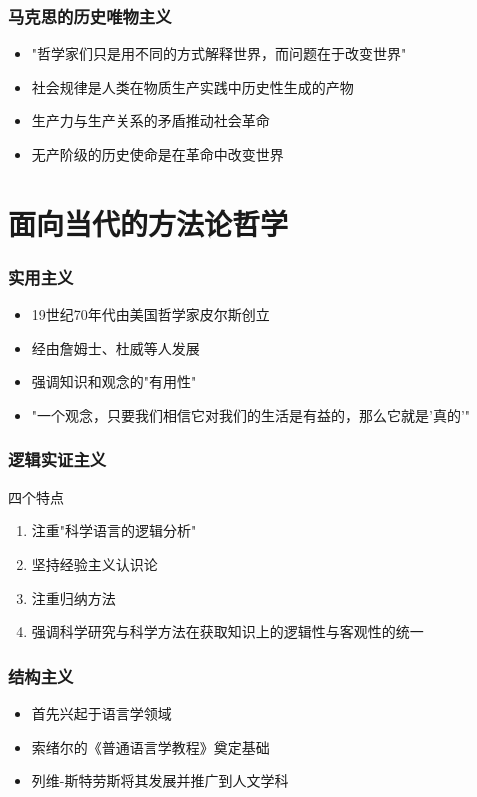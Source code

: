 \documentclass{beamer}
\begin{document}
\begin{frame}
\frametitle{马克思的历史唯物主义}
\begin{itemize}
\item "哲学家们只是用不同的方式解释世界，而问题在于改变世界"
\item 社会规律是人类在物质生产实践中历史性生成的产物
\item 生产力与生产关系的矛盾推动社会革命
\item 无产阶级的历史使命是在革命中改变世界
\end{itemize}
\end{frame}

\section{面向当代的方法论哲学}
\begin{frame}
\frametitle{实用主义}
\begin{itemize}
\item 19世纪70年代由美国哲学家皮尔斯创立
\item 经由詹姆士、杜威等人发展
\item 强调知识和观念的"有用性"
\item "一个观念，只要我们相信它对我们的生活是有益的，那么它就是'真的'"
\end{itemize}
\end{frame}

\begin{frame}
\frametitle{逻辑实证主义}
\begin{block}{四个特点}
\begin{enumerate}
\item 注重"科学语言的逻辑分析"
\item 坚持经验主义认识论
\item 注重归纳方法
\item 强调科学研究与科学方法在获取知识上的逻辑性与客观性的统一
\end{enumerate}
\end{block}
\end{frame}

\begin{frame}
\frametitle{结构主义}
\begin{itemize}
\item 首先兴起于语言学领域
\item 索绪尔的《普通语言学教程》奠定基础
\item 列维-斯特劳斯将其发展并推广到人文学科
\end{itemize}
\end{frame}
\end{document}
